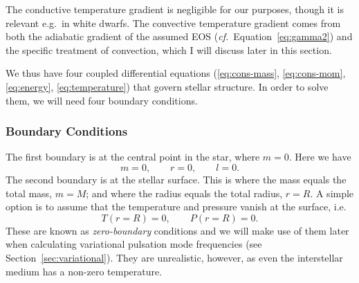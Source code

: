 \begin{description}
    The conductive temperature gradient is negligible for our purposes, though it is relevant e.g.~in white dwarfs. 
    The convective temperature gradient comes from both the adiabatic gradient of the assumed EOS (\emph{cf.}~Equation~\ref{eq:gamma2}) and the specific treatment of convection, which I will discuss later in this section. 

\end{description}

\noindent We thus have four coupled differential equations (\ref{eq:cons-mass}, \ref{eq:cons-mom}, \ref{eq:energy}, \ref{eq:temperature}) that govern stellar structure. 
In order to solve them, we will need four boundary conditions. 

\subsubsection*{Boundary Conditions}

The first boundary is at the central point in the star, where ${m=0}$.
Here we have %
\begin{equation}
    m=0,\qquad r=0,\qquad l=0.
\end{equation} 
The second boundary is at the stellar surface. %
This is where the mass equals the total mass, ${m=M}$; and where the radius equals the total radius, ${r=R}$. 
A simple option is to assume that the temperature and pressure vanish at the surface, i.e.
\begin{equation} \label{eq:zero}
    T(r=R)=0, \qquad P(r=R)=0.
\end{equation}
These are known as \emph{zero-boundary} conditions and we will make use of them later when calculating variational pulsation mode frequencies (see Section~\ref{sec:variational}). 
They are unrealistic, however, as even the interstellar medium has a non-zero temperature. 

